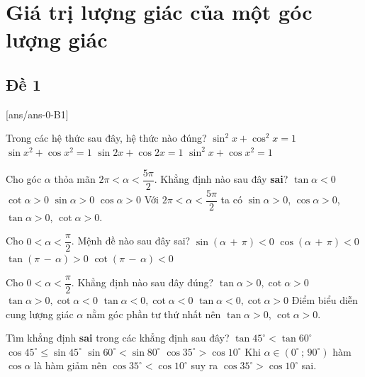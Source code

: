 \section{Giá trị lượng giác của một góc lượng giác}

\subsection{Đề 1}

[ans/ans-0-B1]
\caulc
\begin{ex}%
	Trong các hệ thức sau đây, hệ thức nào đúng?
	\choice
	{\True $\sin^2x+\cos^2x=1$}
	{$\sin{x^2}+\cos{x^2}=1$}
	{$\sin 2x+\cos 2x=1$}
	{$\sin^2x+\cos{x^2}=1$}
	\end{ex}
	

	
	\begin{ex}%
		Cho góc $\alpha $ thỏa mãn $ 2\pi <\alpha <\dfrac{5\pi}{2}$. Khẳng định nào sau đây {\bf sai}?
		\choice
		{\True $\tan\alpha <0$}
		{$\cot\alpha >0$}
		{$\sin\alpha >0$}
		{$\cos\alpha >0$}
		\loigiai
		{	Với $ 2\pi <\alpha <\dfrac{5\pi}{2}$ ta có $\sin\alpha >0$, $\cos\alpha >0$, $\tan\alpha >0$, $\cot\alpha >0$.
		}
		\end{ex}
		
	
		
		\begin{ex}%
			Cho $ 0<\alpha <\dfrac{\pi}{2}$. Mệnh đề nào sau đây sai?
			\choice
			{$\sin (\alpha\,+\,\pi)<0$}
			{$\cos (\alpha\,+\,\pi)<0$}
			{\True $\tan (\pi\,-\,\alpha)>0$}
			{$\cot (\pi\,-\,\alpha)<0$}
		\end{ex}
		
	
			
			\begin{ex}%
				Cho $ 0<\alpha <\dfrac{\pi}{2}$. Khẳng định nào sau đây đúng?
				\choice
				{\True $\tan\alpha >0,\cot\alpha >0$}
				{$\tan\alpha >0,\cot\alpha <0$}
				{$\tan\alpha <0,\cot\alpha <0$}
				{$\tan\alpha <0,\cot\alpha >0$}
				\loigiai
				{		Điểm biểu diễn cung lượng giác $\alpha$ nằm góc phần tư thứ nhất nên $\tan\alpha >0$, $\cot\alpha >0$.}
				\end{ex}
				
		
				
				\begin{ex}%
					Tìm khẳng định {\bf sai} trong các khẳng định sau đây?
					\choice
					{$\tan 45^\circ <\tan 60^\circ $}
					{$\cos 45^\circ\le\sin 45^\circ $}
					{$\sin 60^\circ <\sin 80^\circ $}
					{\True $\cos 35^\circ >\cos 10^\circ $}
					\loigiai
					{Khi $\alpha\in\left(0^\circ\,;\,90^\circ\right)$ hàm $\cos\alpha $ là hàm giảm nên $\cos 35^\circ <\cos 10^\circ $ suy ra $\cos 35^\circ >\cos 10^\circ $ sai.}
				\end{ex}
				
